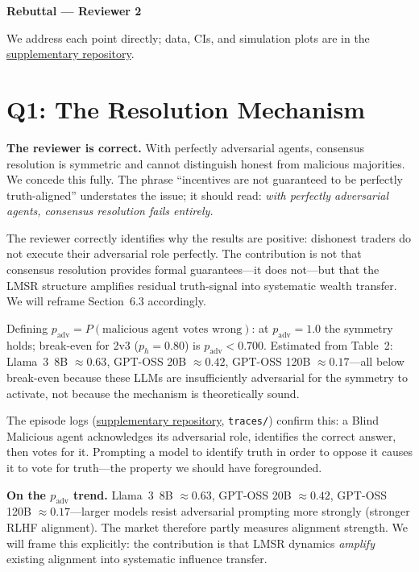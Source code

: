 \documentclass[10pt]{article}
\newcommand{\supp}{\href{[ANONYMISED\_REPO\_URL]}{supplementary repository}}
\begin{document}
\begin{center}
  {\large\bfseries Rebuttal --- Reviewer 2}
\end{center}

We address each point directly; data, CIs, and simulation plots are in the \supp.

\section*{Q1: The Resolution Mechanism}

\textbf{The reviewer is correct.} With perfectly adversarial agents, consensus
resolution is symmetric and cannot distinguish honest from malicious majorities.
We concede this fully. The phrase ``incentives are not guaranteed to be perfectly
truth-aligned'' understates the issue; it should read: \emph{with perfectly
adversarial agents, consensus resolution fails entirely.}

The reviewer correctly identifies why the results are positive: dishonest traders
do not execute their adversarial role perfectly. The contribution is not that
consensus resolution provides formal guarantees---it does not---but that the LMSR
structure amplifies residual truth-signal into systematic wealth transfer. We will
reframe Section~6.3 accordingly.

Defining $p_\text{adv} = P(\text{malicious agent votes wrong})$: at
$p_\text{adv}{=}1.0$ the symmetry holds; break-even for 2v3 ($p_h{=}0.80$) is
$p_\text{adv} < 0.700$. Estimated from Table~2: Llama~3~8B ${\approx}0.63$,
GPT-OSS 20B ${\approx}0.42$, GPT-OSS 120B ${\approx}0.17$---all below
break-even because these LLMs are insufficiently adversarial for the symmetry
to activate, not because the mechanism is theoretically sound.

The episode logs (\supp, \texttt{traces/}) confirm this: a Blind Malicious agent
acknowledges its adversarial role, identifies the correct answer, then votes for
it. Prompting a model to identify truth in order to oppose it causes it to vote
for truth---the property we should have foregrounded.

\textbf{On the $p_\text{adv}$ trend.} Llama~3~8B ${\approx}0.63$,
GPT-OSS 20B ${\approx}0.42$, GPT-OSS 120B ${\approx}0.17$---larger models resist
adversarial prompting more strongly (stronger RLHF alignment). The market
therefore partly measures alignment strength. We will frame this explicitly: the
contribution is that LMSR dynamics \emph{amplify} existing alignment into
systematic influence transfer.
\end{document}
